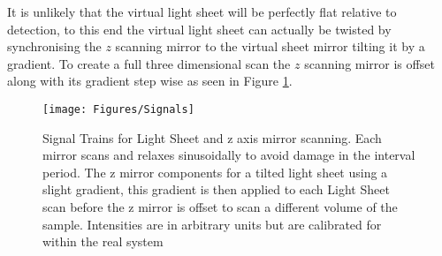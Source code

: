\documentclass[10pt,a4paper]{report}
\begin{document}
\begin{spacing}{1.5}
It is unlikely that the virtual light sheet will be perfectly flat relative to detection, to this end the virtual light sheet can actually be twisted by synchronising the $z$ scanning mirror to the virtual sheet mirror tilting it by a gradient. To create a full three dimensional scan the $z$ scanning mirror is offset along with its gradient step wise as seen in Figure \ref{fig:Signals}.

\begin{figure}
\centering
\texttt{[image: Figures/Signals]}
\caption[Light Sheet Signal Trains]{Signal Trains for Light Sheet and z axis mirror scanning. Each mirror scans and relaxes sinusoidally to avoid damage in the interval period. The z mirror components for a tilted light sheet using a slight gradient, this gradient is then applied to each Light Sheet scan before the z mirror is offset to scan a different volume of the sample. Intensities are in arbitrary units but are calibrated for within the real system}
\label{fig:Signals}
\end{figure}


\end{spacing}
\end{document}
